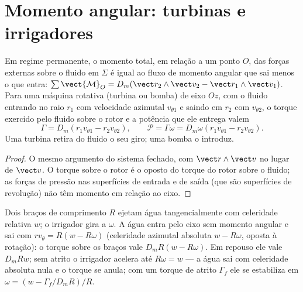 \section{Momento angular: turbinas e irrigadores}

\begin{theorem}\label{thm:b2:flow-balances:angular}
Em regime permanente, o momento total, em relação a um ponto $O$, das forças
externas sobre o fluido em $\Sigma$ é igual ao fluxo de momento angular
que sai menos o que entra: $\sum\vect{\mathcal M}_O = D_m(\vect r_2\wedge\vect v_2 - \vect r_1
\wedge\vect v_1)$. Para uma máquina rotativa (turbina ou bomba) de eixo $Oz$,
com o fluido entrando no raio $r_1$ com velocidade azimutal
$v_{\theta1}$ e saindo em $r_2$ com $v_{\theta2}$, o torque exercido pelo
fluido sobre o rotor e a potência que ele entrega valem
\[
\Gamma = D_m(r_1v_{\theta1} - r_2v_{\theta2}) , \qquad
\mathcal P = \Gamma\omega = D_m\omega(r_1v_{\theta1} - r_2v_{\theta2}) .
\]
Uma turbina retira do fluido o seu giro; uma bomba o introduz.
\end{theorem}

\begin{proof}
O mesmo argumento do sistema fechado, com $\vect r\wedge\vect v$ no lugar de
$\vect v$. O torque sobre o rotor é o oposto do torque do
rotor sobre o fluido; as forças de pressão nas superfícies de entrada e de saída
(que são superfícies de revolução) não têm momento em relação ao
eixo.
\end{proof}

\begin{example}\label{ex:b2:flow-balances:sprinkler}
Dois braços de comprimento $R$ ejetam água tangencialmente com celeridade relativa
$w$; o irrigador gira a $\omega$. A água entra pelo eixo sem
momento angular e sai com $r v_\theta = R(w - R\omega)$ (celeridade
azimutal absoluta $w - R\omega$, oposta à rotação): o torque sobre os
braços vale $D_mR(w - R\omega)$. Em repouso ele vale $D_mRw$; sem atrito o
irrigador acelera até $R\omega = w$ --- a água sai com celeridade
absoluta nula e o torque se anula; com um torque de atrito
$\Gamma_f$ ele se estabiliza em $\omega = (w - \Gamma_f/D_mR)/R$.
\end{example}

